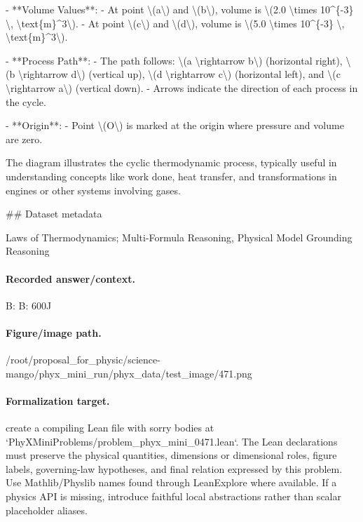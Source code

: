 - **Volume Values**:
  - At point \textbackslash{}(a\textbackslash{}) and \textbackslash{}(b\textbackslash{}), volume is \textbackslash{}(2.0 \textbackslash{}times 10\textasciicircum{}\{-3\} \textbackslash{}, \textbackslash{}text\{m\}\textasciicircum{}3\textbackslash{}).
  - At point \textbackslash{}(c\textbackslash{}) and \textbackslash{}(d\textbackslash{}), volume is \textbackslash{}(5.0 \textbackslash{}times 10\textasciicircum{}\{-3\} \textbackslash{}, \textbackslash{}text\{m\}\textasciicircum{}3\textbackslash{}).

- **Process Path**:
  - The path follows: \textbackslash{}(a \textbackslash{}rightarrow b\textbackslash{}) (horizontal right), \textbackslash{}(b \textbackslash{}rightarrow d\textbackslash{}) (vertical up), \textbackslash{}(d \textbackslash{}rightarrow c\textbackslash{}) (horizontal left), and \textbackslash{}(c \textbackslash{}rightarrow a\textbackslash{}) (vertical down).
  - Arrows indicate the direction of each process in the cycle. 

- **Origin**:
  - Point \textbackslash{}(O\textbackslash{}) is marked at the origin where pressure and volume are zero. 

The diagram illustrates the cyclic thermodynamic process, typically useful in understanding concepts like work done, heat transfer, and transformations in engines or other systems involving gases.

\#\# Dataset metadata

Laws of Thermodynamics; Multi-Formula Reasoning, Physical Model Grounding Reasoning

\paragraph{Recorded answer/context.}
B: B: 600J

\paragraph{Figure/image path.}
/root/proposal\_for\_physic/science-mango/phyx\_mini\_run/phyx\_data/test\_image/471.png

\paragraph{Formalization target.}
create a compiling Lean file with sorry bodies at `PhyXMiniProblems/problem\_phyx\_mini\_0471.lean`. The Lean declarations must preserve the physical quantities, dimensions or dimensional roles, figure labels, governing-law hypotheses, and final relation expressed by this problem.
Use Mathlib/Physlib names found through LeanExplore where available. If a physics API is missing, introduce faithful local abstractions rather than scalar placeholder aliases.

